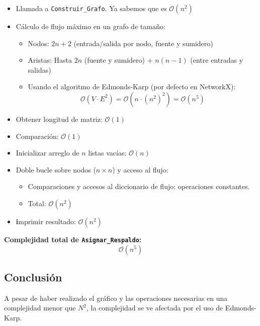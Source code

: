 \documentclass[a4paper, 12pt]{article}
\begin{document}
\begin{itemize}
    \item  Llamada a \texttt{Construir\_Grafo}. Ya sabemos que es $\mathcal{O}(n^2)$

    \item Cálculo de flujo máximo en un grafo de tamaño:
    \begin{itemize}
        \item Nodos: $2n + 2$ (entrada/salida por nodo, fuente y sumidero)
        \item Aristas: Hasta $2n$ (fuente y sumidero) + $n(n - 1)$ (entre entradas y salidas)
        \item Usando el algoritmo de Edmonds-Karp (por defecto en NetworkX): \\
        \[
        \mathcal{O}(V \cdot E^2) = \mathcal{O}(n \cdot (n^2)^2) = \mathcal{O}(n^5)
        \]
    \end{itemize}

    \item  Obtener longitud de matriz: $\mathcal{O}(1)$

    \item  Comparación: $\mathcal{O}(1)$

    \item  Inicializar arreglo de $n$ listas vacías: $\mathcal{O}(n)$

    \item   Doble bucle sobre nodos ($n \times n$) y acceso al flujo:
    \begin{itemize}
        \item Comparaciones y accesos al diccionario de flujo: operaciones constantes.
        \item Total: $\mathcal{O}(n^2)$ 
    \end{itemize}
       \item \textbf imprimir resultado: $\mathcal{O}(n^2)$
\end{itemize}

\vspace{0.5em}
\noindent\textbf{Complejidad total de \texttt{Asignar\_Respaldo}:}
\[
\boxed{\mathcal{O}(n^5)}
\]

\subsection{Conclusión}
A pesar de haber realizado el gráfico y las operaciones necesarias en una complejidad menor que $N^2$, la complejidad se ve afectada por el uso de Edmonds-Karp.
\end{document}
